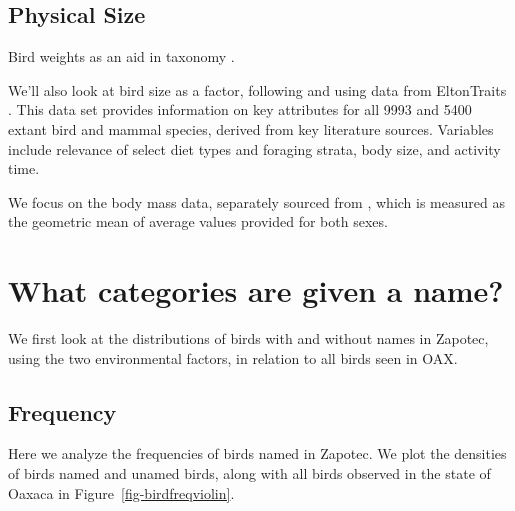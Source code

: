 \documentclass[10pt,letterpaper]{article}
\begin{document}
\subsection{Physical Size}
Bird weights as an aid in taxonomy \cite{amadon1943bird}.

We'll also look at bird size as a factor, following \cite{hunn1999size} and using data from EltonTraits \cite{wilman2014eltontraits}.  This data set provides information on key attributes for all 9993 and 5400 extant bird and mammal species, derived from key literature sources. Variables include relevance of select diet types and foraging strata, body size, and activity time.

We focus on the body mass data, separately sourced from \cite{dunning2007crc}, which is measured as the geometric mean of average values provided for both sexes.




\section{What categories are given a name?}

We first look at the distributions of birds with and without names in Zapotec, using the two environmental factors, in relation to all birds seen in OAX.

\subsection{Frequency}
Here we analyze the frequencies of birds named in Zapotec. We plot the densities of birds named and unamed birds, along with all birds observed in the state of Oaxaca in Figure~\ref{fig-birdfreqviolin}.
\end{document}
